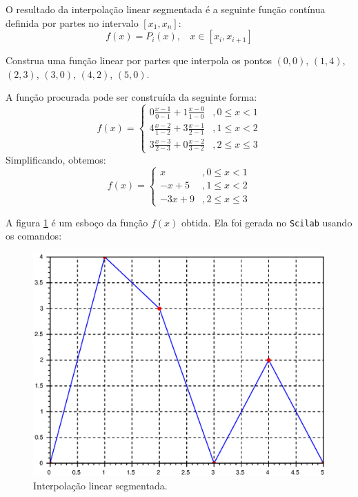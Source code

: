 O resultado da interpolação linear segmentada é a seguinte função contínua definida por partes no intervalo $[x_1,x_n]$:
$$f(x)=P_i(x), ~~~~ x\in [x_i,x_{i+1}]$$

\begin{ex}
  Construa uma função linear por partes que interpola os pontos $(0,0)$, $(1,4)$, $(2,3)$, $(3,0)$, $(4,2)$, $(5,0)$.

A função procurada pode ser construída da seguinte forma:
\begin{equation*}
  f(x) = \left\{
    \begin{array}{ll}
      0\frac{x-1}{0-1} + 1\frac{x-0}{1-0} &, 0 \leq x < 1\\
      4\frac{x-2}{1-2} + 3\frac{x-1}{2-1} &, 1\leq x < 2\\
      3\frac{x-3}{2-3} + 0\frac{x-2}{3-2} &, 2\leq x \leq 3
    \end{array}
\right.
\end{equation*}
Simplificando, obtemos:
\begin{equation*}
  f(x) = \left\{
    \begin{array}{ll}
      x &, 0 \leq x < 1\\
      -x + 5 &, 1\leq x < 2\\
      -3x + 9 &, 2\leq x \leq 3
    \end{array}
\right.  
\end{equation*}
\end{ex}

A figura \ref{fig:linear_segmentada} é um esboço da função $f(x)$ obtida. 
\ifisscilab
Ela foi gerada no \verb+Scilab+ usando os comandos:

\fi

\begin{figure}[htp]
  \begin{center}
    \includegraphics[scale=0.5]{./cap_interp/pics/interpolacao_linear_segmentada.eps}
    \caption{Interpolação linear segmentada.}
    \label{fig:linear_segmentada}
  \end{center}
\end{figure}


